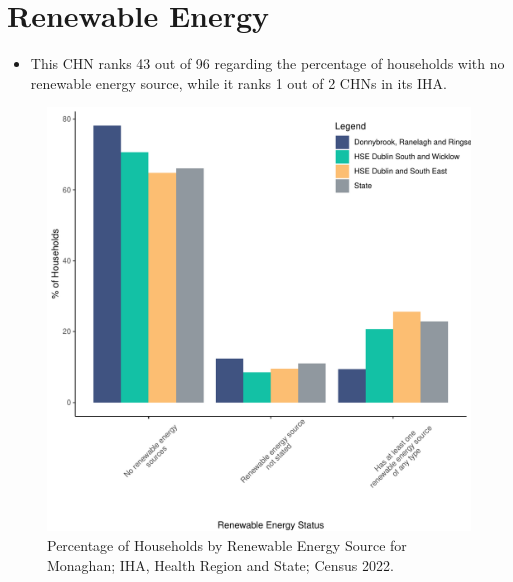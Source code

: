 \documentclass{article}
\begin{document}
\section{Renewable Energy}\label{sect:RE}
\begin{itemize}
\item This CHN ranks  43 out of 96 regarding the percentage of households with no renewable energy source, while it ranks   1 out of 2 CHNs in its IHA.
\end{itemize}
\begin{figure}[H]
	\centering
	\includegraphics[width = 140mm]{../figures/RenewableEnergyED.pdf}
	\caption{Percentage of Households by Renewable Energy Source for Monaghan; IHA, Health Region and State; Census 2022.}
	\label{fig:vbnv}
	\end{figure}
\end{document}
